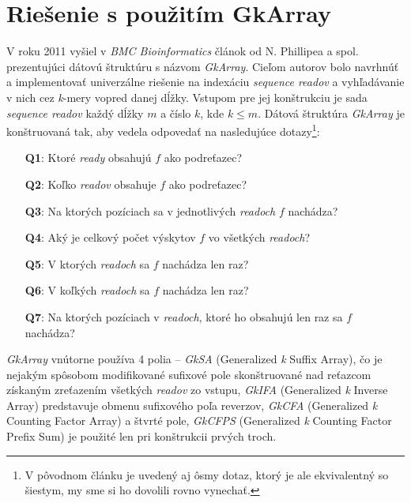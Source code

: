 
\section{Riešenie s použitím GkArray}
V roku 2011 vyšiel v \emph{BMC Bioinformatics} článok od N. Phillipea a spol.\cite{NP11} prezentujúci dátovú štruktúru s názvom \emph{GkArray}. Cieľom autorov bolo navrhnúť a implementovať univerzálne riešenie na indexáciu \emph{sequence readov} a vyhľadávanie v nich cez \emph{k}-mery vopred danej dĺžky. Vstupom pre jej konštrukciu je sada \emph{sequence readov} každý  dĺžky $m$ a číslo $k$, kde $k \leq m$. Dátová štruktúra \emph{GkArray} je konštruovaná tak, aby vedela odpovedať na nasledujúce dotazy\footnote{V pôvodnom článku je uvedený aj ôsmy dotaz, ktorý je ale ekvivalentný so šiestym, my sme si ho dovolili rovno vynechať.}:

\begin{itemize}
    \item[\textbf{Q1}:]{Ktoré \emph{ready} obsahujú $f$ ako podreťazec?}
    \item[\textbf{Q2}:]{Koľko \emph{readov} obsahuje $f$ ako podreťazec?}
    \item[\textbf{Q3}:]{Na ktorých pozíciach sa v jednotlivých \emph{readoch} $f$ nachádza?}
    \item[\textbf{Q4}:]{Aký je celkový počet výskytov $f$ vo všetkých \emph{readoch}?}
    \item[\textbf{Q5}:]{V ktorých \emph{readoch} sa $f$ nachádza len raz?}
    \item[\textbf{Q6}:]{V koľkých \emph{readoch} sa $f$ nachádza len raz?}
    \item[\textbf{Q7}:]{Na ktorých pozíciach v \emph{readoch}, ktoré ho obsahujú len raz sa $f$ nachádza?}
\end{itemize}

\emph{GkArray} vnútorne používa 4 polia -- \emph{GkSA} (Generalized \emph{k} Suffix Array), čo je nejakým spôsobom modifikované sufixové pole skonštruované nad reťazcom získaným zreťazením všetkých \emph{readov} zo vstupu, \emph{GkIFA} (Generalized \emph{k} Inverse Array) predstavuje obmenu sufixového poľa reverzov, \emph{GkCFA} (Generalized \emph{k} Counting Factor Array) a štvrté pole, \emph{GkCFPS} (Generalized \emph{k} Counting Factor Prefix Sum) je použité len pri konštrukcii prvých troch.


